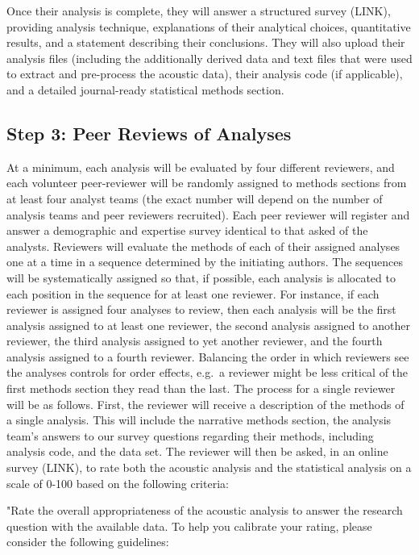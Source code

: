 \documentclass[
  english,
  man,floatsintext]{apa6}
\begin{document}
Once their analysis is complete, they will answer a structured survey (LINK), providing analysis technique, explanations of their analytical choices, quantitative results, and a statement describing their conclusions.
They will also upload their analysis files (including the additionally derived data and text files that were used to extract and pre-process the acoustic data), their analysis code (if applicable), and a detailed journal-ready statistical methods section.

\hypertarget{step-3-peer-reviews-of-analyses}{%
\subsection{Step 3: Peer Reviews of Analyses}\label{step-3-peer-reviews-of-analyses}}

At a minimum, each analysis will be evaluated by four different reviewers, and each volunteer peer-reviewer will be randomly assigned to methods sections from at least four analyst teams (the exact number will depend on the number of analysis teams and peer reviewers recruited).
Each peer reviewer will register and answer a demographic and expertise survey identical to that asked of the analysts.
Reviewers will evaluate the methods of each of their assigned analyses one at a time in a sequence determined by the initiating authors.
The sequences will be systematically assigned so that, if possible, each analysis is allocated to each position in the sequence for at least one reviewer.
For instance, if each reviewer is assigned four analyses to review, then each analysis will be the first analysis assigned to at least one reviewer, the second analysis assigned to another reviewer, the third analysis assigned to yet another reviewer, and the fourth analysis assigned to a fourth reviewer.
Balancing the order in which reviewers see the analyses controls for order effects, e.g.~a reviewer might be less critical of the first methods section they read than the last.
The process for a single reviewer will be as follows.
First, the reviewer will receive a description of the methods of a single analysis.
This will include the narrative methods section, the analysis team's answers to our survey questions regarding their methods, including analysis code, and the data set.
The reviewer will then be asked, in an online survey (LINK), to rate both the acoustic analysis and the statistical analysis on a scale of 0-100 based on the following criteria:

"Rate the overall appropriateness of the acoustic analysis to answer the research question with the available data. To help you calibrate your rating, please consider the following guidelines:
\end{document}
